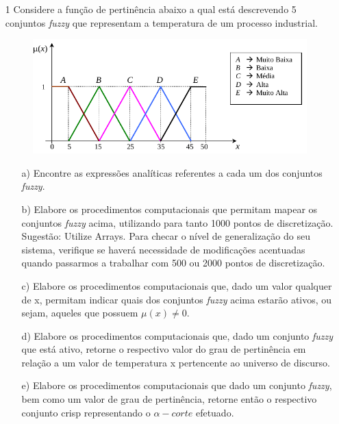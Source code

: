 \documentclass{report}
\begin{document}
\newpage

\begin{enumerate}

\item[1]  Considere a função de pertinência abaixo a qual está descrevendo 5 conjuntos \emph{fuzzy} que
representam a temperatura de um processo industrial.

\begin{figure}[hptb]
\centering
\includegraphics[scale=1]{plot1.png}
\end{figure}


\begin{enumerate}

\item[a)] Encontre as expressões analíticas referentes a cada um dos conjuntos \emph{fuzzy}.


\item[b)] Elabore os procedimentos computacionais que permitam mapear os conjuntos \emph{fuzzy} acima,
utilizando para tanto 1000 pontos de discretização. {Sugestão: Utilize Arrays}. Para checar o nível de 
generalização do seu sistema, verifique se haverá necessidade de modificações acentuadas quando passarmos 
a trabalhar com 500 ou 2000 pontos de discretização.


\item[c)] Elabore os procedimentos computacionais que, dado um valor qualquer de x, permitam
indicar quais dos conjuntos \emph{fuzzy} acima estarão ativos, ou sejam, aqueles que possuem
$\mu(x) \neq 0$.


\item[d)] Elabore os procedimentos computacionais que, dado um conjunto \emph{fuzzy} que está ativo,
retorne o respectivo valor do grau de pertinência em relação a um valor de temperatura x
pertencente ao universo de discurso.


\item[e)] Elabore os procedimentos computacionais que dado um conjunto \emph{fuzzy}, bem como um
valor de grau de pertinência, retorne então o respectivo conjunto crisp representando o $\alpha-
corte$ efetuado.



\end{enumerate}
\end{enumerate}
\end{document}
